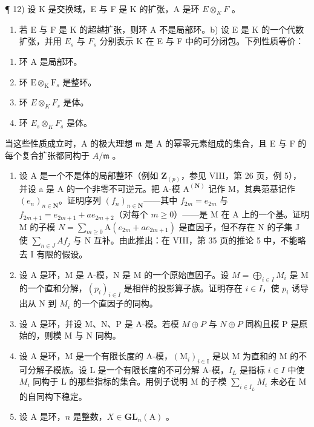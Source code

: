 ¶ 12) 设 K 是交换域，E 与 F 是 K 的扩张，A 是环 \(E \otimes_{K} F\) 。

\begin{enumerate}
\def\labelenumi{\alph{enumi})}
\tightlist
\item
  若 E 与 F 是 K 的超越扩张，则环 A 不是局部环。b) 设 E 是 K 的一个代数扩张，并用 \(E_{s}\) 与 \(F_{s}\) 分别表示 K 在 E 与 F 中的可分闭包。下列性质等价：
\end{enumerate}

\begin{enumerate}
\def\labelenumi{(\roman{enumi})}
\item
  环 A 是局部环。
\item
  环 \(\mathrm{E}\otimes_{\mathrm{K}}\mathrm{F}_s\) 是整环。
\item
  环 \(E \otimes_{K} F_{s}\) 是体。
\item
  环 \(E_{s} \otimes_{K} F_{s}\) 是体。
\end{enumerate}

当这些性质成立时，A 的极大理想 \(\mathfrak{m}\) 是 A 的幂零元素组成的集合，且 E 与 F 的每个复合扩张都同构于 \(A / \mathfrak{m}\) 。

\begin{enumerate}
\def\labelenumi{\arabic{enumi})}
\setcounter{enumi}{12}
\item
  设 A 是一个不是体的局部整环（例如 \(\mathbf{Z}_{(p)}\)，参见 VIII，第 26 页，例 5），并设 a 是 A 的一个非零不可逆元。把 A-模 \(\mathrm{A}^{(\mathbf{N})}\) 记作 M，其典范基记作 \((e_{n})_{n\in\mathbf{N}}\)。证明序列 \((f_{n})_{n\in\mathbf{N}}\)——其中 \(f_{2m}=e_{2m}\) 与 \(f_{2m+1}=e_{2m+1}+ae_{2m+2}\)（对每个 \(m\geqslant0\)）——是 M 在 A 上的一个基。证明 M 的子模 \(N=\sum_{m\geqslant0}\mathrm{A}(e_{2m}+ae_{2m+1})\) 是直因子，但不存在 N 的子集 J 使 \(\sum_{n\in J}Af_{j}\) 与 N 互补。由此推出：在 VIII，第 35 页的推论 5 中，不能略去 I 有限的假设。
\item
  设 A 是环，M 是 A-模，N 是 M 的一个原始直因子。设 \(M = \bigoplus_{i \in I} M_i\) 是 M 的一个直和分解，\((p_i)_{i \in I}\) 是相伴的投影算子族。证明存在 \(i \in I\)，使 \(p_i\) 诱导出从 N 到 \(M_i\) 的一个直因子的同构。
\item
  设 A 是环，并设 M、N、P 是 A-模。若模 \(M \oplus P\) 与 \(N \oplus P\) 同构且模 P 是原始的，则模 M 与 N 同构。
\item
  设 A 是环，M 是一个有限长度的 A-模，\((\mathrm{M}_{i})_{i\in\mathrm{I}}\) 是以 M 为直和的 M 的不可分解子模族。设 L 是一个有限长度的不可分解 A-模，\(I_{L}\) 是指标 \(i\in I\) 中使 \(M_{i}\) 同构于 L 的那些指标的集合。用例子说明 M 的子模 \(\sum_{i\in I_{L}}M_{i}\) 未必在 M 的自同构下稳定。
\item
  设 \(\mathrm{A}\) 是环，\(n\) 是整数，\(X \in \mathbf{GL}_n(\mathrm{A})\) 。
\end{enumerate}

